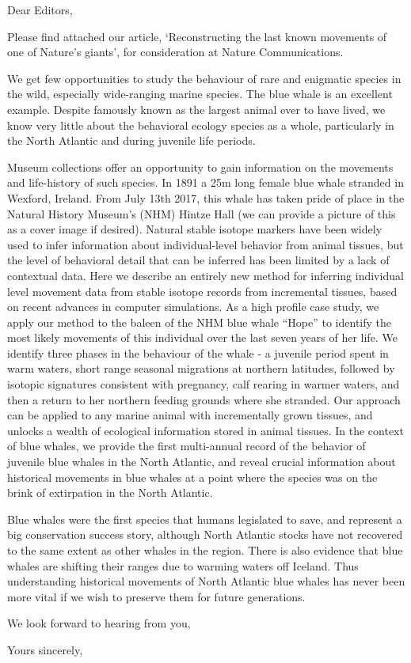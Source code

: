 \documentclass[11pt]{letter}
\begin{document}
\begin{letter}{}
\opening{Dear Editors,}

Please find attached our article, `Reconstructing the last known movements of one of Nature's giants', for consideration at Nature Communications.

We get few opportunities to study the behaviour of rare and enigmatic species in the wild, especially wide-ranging marine species. 
The blue whale is an excellent example. 
Despite famously known as the largest animal ever to have lived, we know very little about the behavioral ecology species as a whole, particularly in the North Atlantic and during juvenile life periods.

Museum collections offer an opportunity to gain information on the movements and life-history of such species. 
In 1891 a 25m long female blue whale stranded in Wexford, Ireland. 
From July 13th 2017, this whale has taken pride of place in the Natural History Museum's (NHM) Hintze Hall (we can provide a picture of this as a cover image if desired).
Natural stable isotope markers have been widely used to infer information about individual-level behavior from animal tissues, but the level of behavioral detail that can be inferred has been limited by a lack of contextual data. 
Here we describe an entirely new method for inferring individual level movement data from stable isotope records from incremental tissues, based on recent advances in computer simulations. 
As a high profile case study, we apply our method to the baleen of the NHM blue whale ``Hope'' to identify the most likely movements of this individual over the last seven years of her life. We identify three phases in the behaviour of the whale - a juvenile period spent in warm waters, short range seasonal migrations at northern latitudes, followed by isotopic signatures consistent with pregnancy, calf rearing in warmer waters, and then a return to her northern feeding grounds where she stranded. Our approach can be applied to any marine animal with incrementally grown tissues, and unlocks a wealth of ecological information stored in animal tissues. In the context of blue whales, we provide the first multi-annual record of the behavior of juvenile blue whales in the North Atlantic, and reveal crucial information about historical movements in blue whales at a point where the species was on the brink of extirpation in the North Atlantic.

Blue whales were the first species that humans legislated to save, and represent a big conservation success story, although North Atlantic stocks have not recovered to the same extent as other whales in the region. There is also evidence that blue whales are shifting their ranges due to warming waters off Iceland. Thus understanding historical movements of North Atlantic blue whales has never been more vital if we wish to preserve them for future generations.
 
We look forward to hearing from you,


\closing{Yours sincerely,}


\end{letter}
\end{document}
